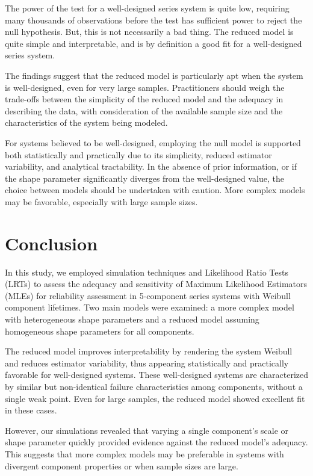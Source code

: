 \documentclass[11pt]{article}
\begin{document}
The power of the test for a well-designed series system is quite low, requiring many thousands of observations before the test has sufficient power to reject the null hypothesis. But, this is not necessarily a bad thing. The reduced model is quite simple and interpretable, and is by definition a good fit for a well-designed series system.

The findings suggest that the reduced model is particularly apt when the system is well-designed, even for very large samples. Practitioners should weigh the trade-offs between the simplicity of the reduced model and the adequacy in describing the data, with consideration of the available sample size and the characteristics of the system being modeled.

For systems believed to be well-designed, employing the null model is supported both statistically and practically due to its simplicity, reduced estimator variability, and analytical tractability. In the absence of prior information, or if the shape parameter significantly diverges from the well-designed value, the choice between models should be undertaken with caution. More complex models may be favorable, especially with large sample sizes.

\section{Conclusion}

In this study, we employed simulation techniques and Likelihood Ratio Tests (LRTs) to assess the adequacy and sensitivity of Maximum Likelihood Estimators (MLEs) for reliability assessment in 5-component series systems with Weibull component lifetimes. Two main models were examined: a more complex model with heterogeneous shape parameters and a reduced model assuming homogeneous shape parameters for all components.

The reduced model improves interpretability by rendering the system Weibull and reduces estimator variability, thus appearing statistically and practically favorable for well-designed systems. These well-designed systems are characterized by similar but non-identical failure characteristics among components, without a single weak point. Even for large samples, the reduced model showed excellent fit in these cases.

However, our simulations revealed that varying a single component's scale or shape parameter quickly provided evidence against the reduced model's adequacy. This suggests that more complex models may be preferable in systems with divergent component properties or when sample sizes are large.
\end{document}
